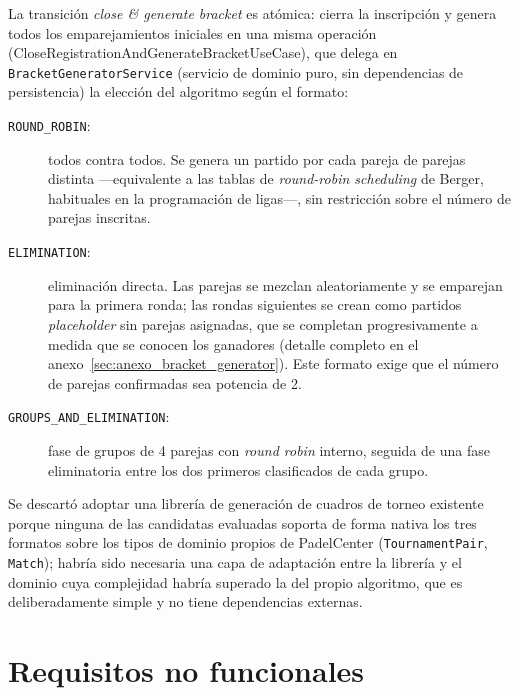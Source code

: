 La transición \textit{close \& generate bracket} es atómica: cierra la
inscripción y genera todos los emparejamientos iniciales en una misma operación
({\ttfamily Close\-Registration\-And\-Generate\-Bracket\-Use\-Case}), que
delega en \texttt{BracketGeneratorService} (servicio de dominio puro, sin
dependencias de persistencia) la elección del algoritmo según el formato:

\begin{description}
  \item[\texttt{ROUND\_ROBIN}:] todos contra todos. Se genera un partido por
    cada pareja de parejas distinta —equivalente a las tablas de
    \textit{round-robin scheduling} de Berger, habituales en la programación
    de ligas—, sin restricción sobre el número de parejas inscritas.
  \item[\texttt{ELIMINATION}:] eliminación directa. Las parejas se mezclan
    aleatoriamente y se emparejan para la primera ronda; las rondas siguientes
    se crean como partidos \textit{placeholder} sin parejas asignadas, que se
    completan progresivamente a medida que se conocen los ganadores
    (detalle completo en el anexo~\ref{sec:anexo_bracket_generator}). Este
    formato exige que el número de parejas confirmadas sea potencia de 2.
  \item[\texttt{GROUPS\_AND\_ELIMINATION}:] fase de grupos de 4 parejas con
    \textit{round robin} interno, seguida de una fase eliminatoria entre los
    dos primeros clasificados de cada grupo.
\end{description}

Se descartó adoptar una librería de generación de cuadros de torneo existente
porque ninguna de las candidatas evaluadas soporta de forma nativa los tres
formatos sobre los tipos de dominio propios de PadelCenter
(\texttt{TournamentPair}, \texttt{Match}); habría sido necesaria una capa de
adaptación entre la librería y el dominio cuya complejidad habría superado la
del propio algoritmo, que es deliberadamente simple y no tiene dependencias
externas.

\section{Requisitos no funcionales}
\label{sec:requisitos_no_funcionales}

